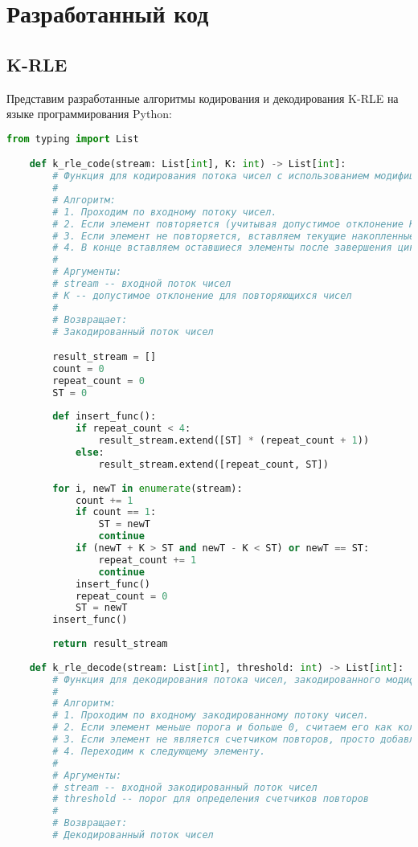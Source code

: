\chapter{Разработанный код}
\label{ch:chap2}

\section{K-RLE}

Представим разработанные алгоритмы кодирования и декодирования K-RLE на языке программирования Python:
\begin{lstlisting}[language=python, caption=K-RLE реализация на языке Python, captionpos=b, frame=single]
    from typing import List

    def k_rle_code(stream: List[int], K: int) -> List[int]:
        # Функция для кодирования потока чисел с использованием модифицированного RLE алгоритма.
        # 
        # Алгоритм:
        # 1. Проходим по входному потоку чисел.
        # 2. Если элемент повторяется (учитывая допустимое отклонение K), увеличиваем счетчик повторов.
        # 3. Если элемент не повторяется, вставляем текущие накопленные повторы в результат.
        # 4. В конце вставляем оставшиеся элементы после завершения цикла.
        # 
        # Аргументы:
        # stream -- входной поток чисел
        # K -- допустимое отклонение для повторяющихся чисел
        # 
        # Возвращает:
        # Закодированный поток чисел

        result_stream = []
        count = 0
        repeat_count = 0
        ST = 0
        
        def insert_func():
            if repeat_count < 4:
                result_stream.extend([ST] * (repeat_count + 1))
            else:
                result_stream.extend([repeat_count, ST])
        
        for i, newT in enumerate(stream):
            count += 1
            if count == 1:
                ST = newT
                continue
            if (newT + K > ST and newT - K < ST) or newT == ST:
                repeat_count += 1
                continue
            insert_func()
            repeat_count = 0
            ST = newT
        insert_func()
            
        return result_stream
    
    def k_rle_decode(stream: List[int], threshold: int) -> List[int]:
        # Функция для декодирования потока чисел, закодированного модифицированным RLE алгоритмом.
        #
        # Алгоритм:
        # 1. Проходим по входному закодированному потоку чисел.
        # 2. Если элемент меньше порога и больше 0, считаем его как количество повторов и добавляем соответствующие элементы в результат.
        # 3. Если элемент не является счетчиком повторов, просто добавляем его в результат.
        # 4. Переходим к следующему элементу.
        #
        # Аргументы:
        # stream -- входной закодированный поток чисел
        # threshold -- порог для определения счетчиков повторов
        #
        # Возвращает:
        # Декодированный поток чисел
        

\end{lstlisting}
